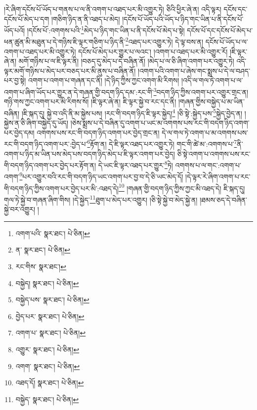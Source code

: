 །རེ་ཞིག་དངོས་པོ་ཡོད་པ་གནས་པ་ལ་ནི་འགག་པ་འཐད་པར་མི་འགྱུར་ཏེ། ཅིའི་ཕྱིར་ཞེ་ན། འདི་ལྟར། དངོས་དང་དངོས་པོ་མེད་པ་དག །གཅིག་ཉིད་ན་ནི་འཐད་པ་མེད། །དངོས་པོ་ཡོད་པའི་ཡོད་པ་ཉིད་གང་ཡིན་པ་ནི་དངོས་པོ་ཡོད་པའོ། །དངོས་པོ་:འགགས་པའི་\footnote{འགག་པའི་  སྣར་ཐང་།  པེ་ཅིན། }མེད་པ་ཉིད་གང་ཡིན་པ་ནི་དངོས་པོ་མེད་པ་སྟེ། དངོས་པོ་དང་དངོས་པོ་མེད་པ་ཕན་ཚུན་མི་མཐུན་པ་དེ་གཉིས་ཇི་ལྟར་གཅིག་པ་ཉིད་ནི་\footnote{ན་  སྣར་ཐང་།  པེ་ཅིན། }འཐད་པར་འགྱུར་ཏེ། དེ་ལྟ་བས་ན། དངོས་པོ་ཡོད་པ་ལ་འགག་པ་འཐད་པར་མི་འགྱུར་ཏེ། དངོས་པོ་མེད་པར་གྱུར་པ་ལའང་། །འགག་པ་འཐད་པར་མི་འགྱུར་རོ། །ཇི་ལྟར་ཞེ་ན། མགོ་གཉིས་པ་ལ་ཇི་ལྟར་ནི། །བཅད་དུ་མེད་པ་དེ་བཞིན་ནོ། །མེད་པ་ལ་ཅི་ཞིག་འགག་པར་འགྱུར་ཏེ། འདི་ལྟར་མགོ་གཉིས་པ་མེད་པར་བཅད་པར་མི་ནུས་པ་བཞིན་ནོ། །འགག་པའི་འགག་པ་ཞེས་གང་སྨྲས་པ་དེ་ལ་བཤད་པར་བྱ་སྟེ། འགག་པ་འགག་པ་གཞན་དང་ནི། །དེ་ཉིད་ཀྱིས་ཀྱང་འགག་མི་རིགས། །འདི་ལ་གལ་ཏེ་འགག་པ་ལ་འགག་པ་ཞིག་ཡོད་པར་གྱུར་ན་དེ་གཞན་གྱི་བདག་ཉིད་དམ་:རང་གི་\footnote{རང་གིས་  སྣར་ཐང་། }བདག་ཉིད་ཀྱིས་འགག་པར་འགྱུར་གྲང་ན། གཉི་གས་ཀྱང་འགག་པར་མི་རིགས་སོ། །ཇི་ལྟར་ཞེ་ན། ཇི་ལྟར་སྐྱེ་བ་རང་དང་ནི། །གཞན་གྱིས་བསྐྱེད་པ་མ་ཡིན་བཞིན། །ཇི་སྐད་དུ། སྐྱེ་བ་འདི་ནི་མ་སྐྱེས་པས། །རང་གི་བདག་ཉིད་ཇི་ལྟར་སྐྱེད།\footnote{བསྐྱེད།  སྣར་ཐང་།  པེ་ཅིན། } །ཅི་སྟེ་:སྐྱེད་པས་\footnote{བསྐྱེད་པས་  སྣར་ཐང་།  པེ་ཅིན། }སྐྱེད་བྱེད་ན། །སྐྱེས་ན་ཅི་ཞིག་བསྐྱེད་དུ་ཡོད། །ཅེས་སྨྲས་པ་དེ་བཞིན་དུ་འགག་པ་ཡང་མ་འགགས་པས་རང་གི་བདག་ཉིད་འགག་པར་བྱེད་དམ། འགགས་པས་རང་གི་བདག་ཉིད་འགག་པར་བྱེད་གྲང་ན། དེ་ལ་གལ་ཏེ་འགག་པ་མ་འགགས་པས་རང་གི་བདག་ཉིད་འགག་པར་:བྱེད་པ་\footnote{བྱེད་པར་  སྣར་ཐང་།  པེ་ཅིན། }རྟོག་ན། དེ་ཇི་ལྟར་འཐད་པར་འགྱུར་ཏེ། གང་གི་ཚེ་མ་:འགགས་པ་\footnote{འགག་པ་  སྣར་ཐང་།  པེ་ཅིན། }ནི་འགག་པ་ཉིད་མ་ཡིན་པས་མེད་པས་བདག་ཉིད་མེད་པ་ཇི་ལྟར་འགག་པར་བྱེད། ཅི་སྟེ་འགག་པ་འགགས་པས་རང་གི་བདག་ཉིད་འགག་པར་བྱེད་པར་རྟོག་ན། དེ་ཡང་ཇི་ལྟར་འཐད་པར་གྱུར་\footnote{འགྱུར་  སྣར་ཐང་།  པེ་ཅིན། }ཏེ། འགགས་པ་ལ་གང་:འགག་པ་འགག་\footnote{འགག་  སྣར་ཐང་།  པེ་ཅིན། }པར་འགྱུར་བའི་རང་གི་བདག་ཉིད་ཡང་འགག་པར་བྱ་བ་དེ་ཅི་ཡང་མེད་དོ། །དེ་ལྟར་རེ་ཞིག་འགག་པ་རང་གི་བདག་ཉིད་ཀྱིས་འགག་པར་བྱེད་པར་མི་:འཐད་དེ།\footnote{འཐད་དོ།  སྣར་ཐང་།  པེ་ཅིན། } །གཞན་གྱི་བདག་ཉིད་ཀྱིས་ཀྱང་མི་འཐད་དེ། ཇི་སྐད་དུ། གལ་ཏེ་སྐྱེ་བ་གཞན་ཞིག་གིས། །དེ་སྐྱེད་\footnote{བསྐྱེད་  སྣར་ཐང་།  པེ་ཅིན། }ཐུག་པ་མེད་པར་འགྱུར། །ཅི་སྟེ་སྐྱེ་བ་མེད་སྐྱེ་ན། །ཐམས་ཅད་དེ་བཞིན་སྐྱེ་བར་འགྱུར། །
